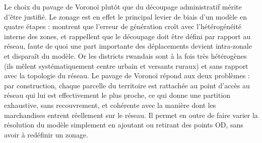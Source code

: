 \documentclass[12pt,a4paper,french]{report}
\begin{document}
	Le choix du pavage de Voronoï plutôt que du découpage administratif mérite d'être justifié. Le zonage est en effet le principal levier de biais d'un modèle en quatre étapes : \cite{HolguinVeras2011} montrent que l'erreur de génération croît avec l'hétérogénéité interne des zones, et \cite{Ortuzar2011} rappellent que le découpage doit être défini par rapport au réseau, faute de quoi une part importante des déplacements devient intra-zonale et disparaît du modèle. Or les districts rwandais sont à la fois très hétérogènes (ils mêlent systématiquement centre urbain et versants ruraux) et sans rapport avec la topologie du réseau. Le pavage de Voronoï répond aux deux problèmes : par construction, chaque parcelle du territoire est rattachée au point d'accès au réseau qui lui est effectivement le plus proche, ce qui donne une partition exhaustive, sans recouvrement, et cohérente avec la manière dont les marchandises entrent réellement sur le réseau. Il permet en outre de faire varier la résolution du modèle simplement en ajoutant ou retirant des points OD, sans avoir à redéfinir un zonage.
	
	\medskip
\end{document}
